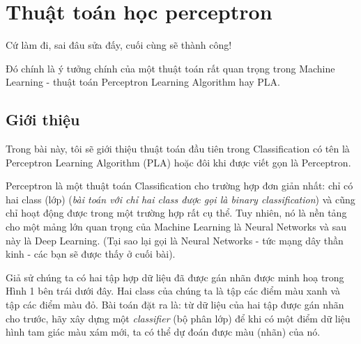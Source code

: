 \chapter{Thuật toán học perceptron}
\label{cha:pla}

Cứ làm đi, sai đâu sửa đấy, cuối cùng sẽ thành công! 
 
Đó chính là ý tưởng chính của một thuật toán rất quan trọng trong Machine Learning - thuật toán Perceptron Learning Algorithm hay PLA. 
 
 
 
 
\section{Giới thiệu}
 
Trong bài này, tôi sẽ giới thiệu thuật toán đầu tiên trong Classification có tên là Perceptron Learning Algorithm (PLA) hoặc đôi khi được viết gọn là Perceptron.  
 
Perceptron là một thuật toán Classification cho trường hợp đơn giản nhất: chỉ có hai class (lớp) (\textit{bài toán với chỉ hai class được gọi là binary classification}) và cũng chỉ hoạt động được trong một trường hợp rất cụ thể. Tuy nhiên, nó là nền tảng cho một mảng lớn quan trọng của Machine Learning là Neural Networks và sau này là Deep Learning. (Tại sao lại gọi là Neural Networks - tức mạng dây thần kinh - các bạn sẽ được thấy ở cuối bài). 
 
Giả sử chúng ta có hai tập hợp dữ liệu đã được gán nhãn được minh hoạ trong Hình 1 bên trái dưới đây. Hai class của chúng ta là tập các điểm màu xanh và tập các điểm màu đỏ. Bài toán đặt ra là: từ dữ liệu của hai tập được gán nhãn cho trước, hãy xây dựng một \textit{classifier} (bộ phân lớp) để khi có một điểm dữ liệu hình tam giác màu xám mới, ta có thể dự đoán được màu (nhãn) của nó.  
 

